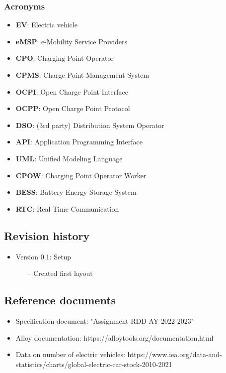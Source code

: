 \documentclass[table, 12pt]{article} %
\begin{document}
    \subsubsection*{Acronyms}
        \begin{itemize}
            \item \textbf{EV}: Electric vehicle
            \item \textbf{eMSP}: e-Mobility Service Providers
            \item \textbf{CPO}: Charging Point Operator
            \item \textbf{CPMS}: Charge Point Management System
            \item \textbf{OCPI}: Open Charge Point Interface
            \item \textbf{OCPP}: Open Charge Point Protocol
            \item \textbf{DSO}: (3rd party) Distribution System Operator
            \item \textbf{API}: Application Programming Interface
            \item \textbf{UML}: Unified Modeling Language
            \item \textbf{CPOW}: Charging Point Operator Worker
            \item \textbf{BESS}: Battery Energy Storage System
            \item \textbf{RTC}: Real Time Communication
        \end{itemize}

    \newpage
    \subsection{Revision history}
        \begin{itemize}
            \item Version 0.1: Setup
            \begin{itemize}
                \item[--] Created first layout
            \end{itemize}
        \end{itemize}

    \subsection{Reference documents}
        \begin{itemize}
            \item Specification document: "Assignment RDD AY 2022-2023"
            \item Alloy documentation: https://alloytools.org/documentation.html
            \item Data on number of electric vehicles: https://www.iea.org/data-and-statistics/charts/global-electric-car-stock-2010-2021
        \end{itemize}
    
\end{document}
